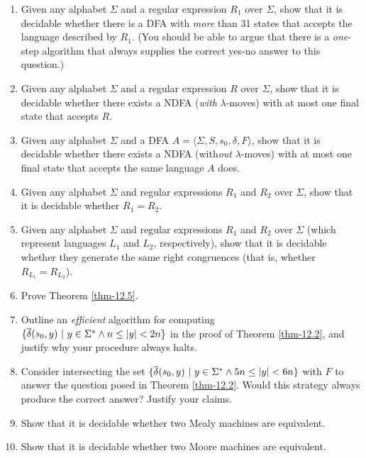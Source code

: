 \begin{enumerate}[{12.}1.]
\item Given any alphabet $\Sigma$ and a regular expression $R_1$ over $\Sigma$,
show that it is decidable whether there is a DFA with \emph{more} than 31 states
that accepts the language described by $R_1$. (You should be able to argue that
there is a \emph{one}-step algorithm that always supplies the correct yes-no
answer to this question.)

\item Given any alphabet $\Sigma$ and a regular expression $R$ over $\Sigma$,
show that it is decidable whether there exists a NDFA (\emph{with}
$\lambda$-moves) with at most one final state that accepts $R$.

\item Given any alphabet $\Sigma$ and a DFA $A=\langle\Sigma,S,s_0,\delta,F
\rangle$, show that it is decidable whether there exists a NDFA (with\emph{out}
$\lambda$-moves) with at most one final state that accepts the same language $A$
does.

\item Given any alphabet $\Sigma$ and regular expressions $R_1$ and $R_2$ over
$\Sigma$, show that it is decidable whether $R_1=R_2$.

\item Given any alphabet $\Sigma$ and regular expressions $R_1$ and $R_2$ over
$\Sigma$ (which represent languages $L_1$ and $L_2$, respectively), show that it
is decidable whether they generate the same right congruences (that is, whether
$R_{L_1}=R_{L_2}$).

\item Prove Theorem \ref{thm-12.5}.

\item Outline an \emph{efficient} algorithm for computing $\{\overline{\delta}(s_0,y)\ |\ y\in
\Sigma^*\wedge n\leq |y| < 2n\}$ in the proof of Theorem \ref{thm-12.2}, and
justify why your procedure always halts.

\item Consider intersecting the set $\{\overline{\delta}(s_0,y)\ |\ y\in\Sigma^*\wedge 5n\leq
|y| < 6n\}$ with $F$ to answer the question posed in Theorem \ref{thm-12.2}.
Would this strategy always produce the correct answer? Justify your claims.

\item Show that it is decidable whether two Mealy machines are equivalent.

\item Show that it is decidable whether two Moore machines are equivalent.


\end{enumerate}
